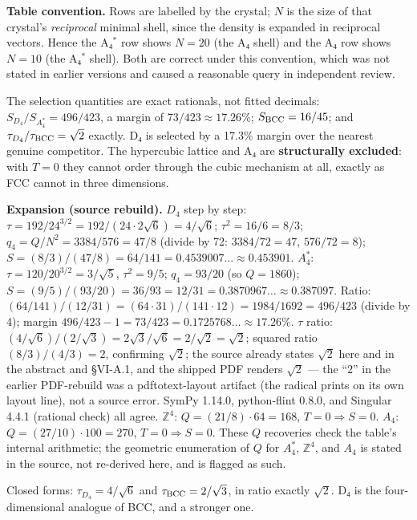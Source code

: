 \documentclass[a4paper,11pt]{article}
\newcommand{\expansion}[1]{\par\smallskip\noindent\textbf{Expansion (source rebuild).} #1\par\smallskip}
\begin{document}
\textbf{Table convention.} Rows are labelled by the crystal; $N$ is the size of that crystal's \textit{reciprocal} minimal shell, since the density is expanded in reciprocal vectors. Hence the A₄$^*$ row shows $N=20$ (the A₄ shell) and the A₄ row shows $N=10$ (the A₄$^*$ shell). Both are correct under this convention, which was not stated in earlier versions and caused a reasonable query in independent review.

The selection quantities are exact rationals, not fitted decimals: $S_{D_4}/S_{A_4^*}=496/423$, a margin of $73/423\approx17.26\%$; $S_{\rm BCC}=16/45$; and $\tau_{D_4}/\tau_{\rm BCC}=\sqrt2$ exactly. D₄ is selected by a 17.3\% margin over the nearest genuine competitor. The hypercubic lattice and A₄ are \textbf{structurally excluded}: with $T=0$ they cannot order through the cubic mechanism at all, exactly as FCC cannot in three dimensions.


\expansion{$D_4$ step by step: $\tau = 192/24^{3/2} = 192/(24\cdot 2\sqrt{6}) = 4/\sqrt{6}$; $\tau^2 = 16/6 = 8/3$; $q_4 = Q/N^2 = 3384/576 = 47/8$ (divide by 72: $3384/72 = 47$, $576/72 = 8$); $S = (8/3)/(47/8) = 64/141 = 0.4539007\ldots \approx 0.453901$. $A_4^*$: $\tau = 120/20^{3/2} = 3/\sqrt{5}$, $\tau^2 = 9/5$; $q_4 = 93/20$ (so $Q = 1860$); $S = (9/5)/(93/20) = 36/93 = 12/31 = 0.3870967\ldots \approx 0.387097$. Ratio: $(64/141)/(12/31) = (64\cdot 31)/(141\cdot 12) = 1984/1692 = 496/423$ (divide by 4); margin $496/423 - 1 = 73/423 = 0.1725768\ldots \approx 17.26\%$. $\tau$ ratio: $(4/\sqrt{6})/(2/\sqrt{3}) = 2\sqrt{3}/\sqrt{6} = 2/\sqrt{2} = \sqrt{2}$; squared ratio $(8/3)/(4/3) = 2$, confirming $\sqrt{2}$; the source already states $\sqrt{2}$ here and in the abstract and \S VI-A.1, and the shipped PDF renders $\sqrt{2}$ --- the ``$2$'' in the earlier PDF-rebuild was a pdftotext-layout artifact (the radical prints on its own layout line), not a source error. SymPy 1.14.0, python-flint 0.8.0, and Singular 4.4.1 (rational check) all agree. $\mathbb{Z}^4$: $Q = (21/8)\cdot 64 = 168$, $T = 0 \Rightarrow S = 0$. $A_4$: $Q = (27/10)\cdot 100 = 270$, $T = 0 \Rightarrow S = 0$. These $Q$ recoveries check the table's internal arithmetic; the geometric enumeration of $Q$ for $A_4^*$, $\mathbb{Z}^4$, and $A_4$ is stated in the source, not re-derived here, and is flagged as such.}
Closed forms: $\tau_{D_4}=4/\sqrt6$ and $\tau_{\rm BCC}=2/\sqrt3$, in ratio exactly $\sqrt2$. D₄ is the four-dimensional analogue of BCC, and a stronger one.
\end{document}
